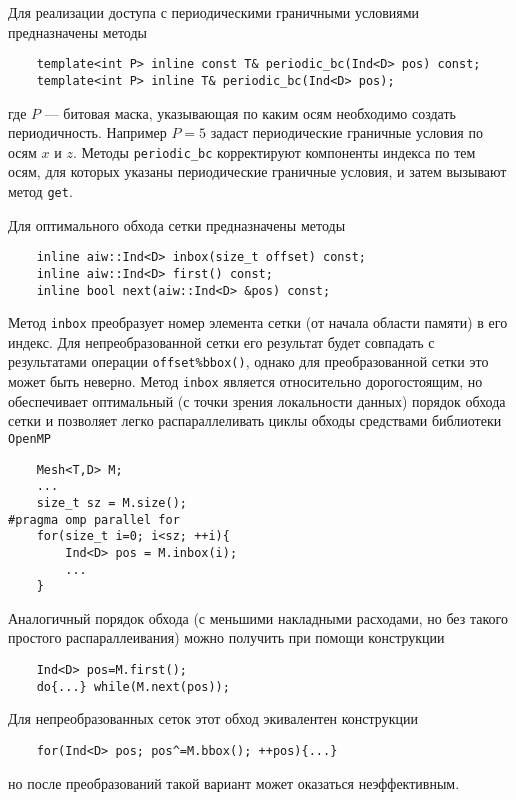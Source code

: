Для реализации доступа с периодическими граничными условиями предназначены методы
\begin{verbatim}
    template<int P> inline const T& periodic_bc(Ind<D> pos) const;
    template<int P> inline T& periodic_bc(Ind<D> pos);
\end{verbatim}
где $P$ --- битовая маска, указывающая по каким осям необходимо создать периодичность.
Например $P=5$ задаст периодические граничные условия по осям $x$ и $z$.
Методы \verb'periodic_bc' корректируют компоненты индекса по тем осям, для которых указаны периодические граничные условия,
и затем вызывают метод \verb'get'.

Для оптимального обхода сетки предназначены методы
\begin{verbatim}
    inline aiw::Ind<D> inbox(size_t offset) const;
    inline aiw::Ind<D> first() const;
    inline bool next(aiw::Ind<D> &pos) const;
\end{verbatim}
Метод \verb'inbox' преобразует номер элемента сетки (от начала области памяти) в его индекс. Для непреобразованной сетки
его результат будет совпадать с результатами операции \verb'offset%bbox()', 
однако для преобразованной сетки это может быть неверно. Метод \verb'inbox' является относительно дорогостоящим,
но обеспечивает оптимальный (с точки зрения локальности данных) порядок обхода сетки и позволяет
легко распараллеливать циклы обходы средствами библиотеки \verb'OpenMP'
\begin{verbatim}
    Mesh<T,D> M;
    ...
    size_t sz = M.size();
#pragma omp parallel for
    for(size_t i=0; i<sz; ++i){
        Ind<D> pos = M.inbox(i);
        ...
    }
\end{verbatim}

Аналогичный порядок обхода (с меньшими накладными расходами, но без такого простого распараллеивания) 
можно получить при помощи конструкции
\begin{verbatim}
    Ind<D> pos=M.first(); 
    do{...} while(M.next(pos));
\end{verbatim}
Для непреобразованных сеток этот обход экивалентен конструкции
\begin{verbatim}
    for(Ind<D> pos; pos^=M.bbox(); ++pos){...} 
\end{verbatim}
но после преобразований такой вариант может оказаться неэффективным.


